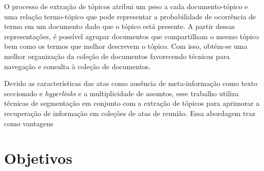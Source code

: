 O processo de extração de tópicos atribui um peso a cada documento-tópico e uma relação termo-tópico que pode representar a probabilidade de ocorrência de termo em um documento dado que o tópico está presente. A partir dessas representações, é possível agrupar documentos que compartilham o mesmo tópico bem como os termos que melhor descrevem o tópico. Com isso, obtém-se uma melhor organização da coleção de documentos favorecendo técnicas para navegação e consulta à coleção de documentos. 




Devido as características das atas como ausência de meta-informação como texto seccionado e \textit{hyperlinks} e a multiplicidade de assuntos, esse trabalho utiliza técnicas de segmentação em conjunto com a extração de tópicos para aprimorar a recuperação de informação em coleções de atas de reunião. Essa abordagem traz como vantagens












\section{Objetivos}

